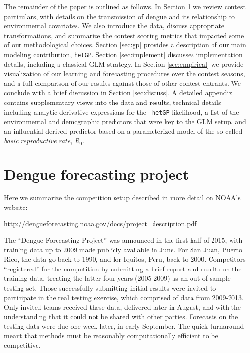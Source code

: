 \documentclass[12pt]{article}
\begin{document}
The remainder of the paper is outlined as follows.  In Section
\ref{sec:dengue} we review contest particulars, with details on the
transmission of dengue and its relationship to environmental covariates. We
also introduce the data, discuss appropriate transformations, and summarize
the contest scoring metrics that impacted some of our methodological choices.
Section \ref{sec:gp} provides a description of our main modeling contribution,
{\tt hetGP}.  Section \ref{sec:implement} discusses implementation details,
including a classical GLM strategy.  In Section \ref{sec:empirical} we provide
visualization of our learning and forecasting procedures over the contest
seasons, and a full comparison of our results against those of other contest
entrants. We conclude with a brief discussion in Section \ref{sec:discuss}.  A
detailed appendix contains supplementary views into the data and results,
technical details including analytic derivative expressions for the {\tt
hetGP} likelihood, a list of the environmental and demographic predictors that
were key to the GLM setup, and an influential derived predictor based on a
parameterized model of the so-called {\em basic reproductive rate}, $R_0$. %

\section{Dengue forecasting project}
\label{sec:dengue}

Here we summarize the competition setup described in more detail on NOAA's website:
\begin{center}
\url{http://dengueforecasting.noaa.gov/docs/project_description.pdf}
\end{center}
The ``Dengue Forecasting Project''  was announced in the first half of 2015,
with training data up to 2009 made publicly available in June.  For San Juan,
Puerto Rico, the data go back to 1990, and for Iquitos, Peru, back to 2000.
Competitors ``registered'' for the competition by submitting a brief report
and results on the training data,  treating the latter four years (2005-2009)
as an out-of-sample testing set. Those successfully submitting initial results
were invited to participate in the real testing exercise, which comprised of
data from 2009-2013. Only invited teams received these data, delivered later
in August, and with the understanding that it could not be shared with other
parties.  Forecasts on the testing data were due one week later, in early
September.  The quick turnaround meant that methods must be reasonably
computationally efficient to be competitive.
\end{document}
